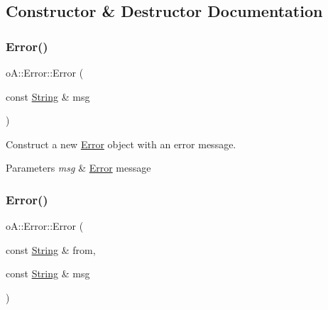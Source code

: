 \subsection{Constructor \& Destructor Documentation}
\mbox{\label{classo_a_1_1_error_a16d10704561d2b756722d71d8703089c}} 
\subsubsection{\texorpdfstring{Error()}{Error()}\hspace{0.1cm}{\footnotesize\ttfamily [1/2]}}
{\footnotesize\ttfamily o\+A\+::\+Error\+::\+Error (\begin{DoxyParamCaption}\item[{const \mbox{\hyperlink{classo_a_1_1_string}{String}} \&}]{msg }\end{DoxyParamCaption})\hspace{0.3cm}{\ttfamily [inline]}}



Construct a new \mbox{\hyperlink{classo_a_1_1_error}{Error}} object with an error message. 


\begin{DoxyParams}{Parameters}
{\em msg} & \mbox{\hyperlink{classo_a_1_1_error}{Error}} message \\
\hline
\end{DoxyParams}
\mbox{\label{classo_a_1_1_error_adf66492ca8b03fa14d09e5bba7cdacbd}} 
\subsubsection{\texorpdfstring{Error()}{Error()}\hspace{0.1cm}{\footnotesize\ttfamily [2/2]}}
{\footnotesize\ttfamily o\+A\+::\+Error\+::\+Error (\begin{DoxyParamCaption}\item[{const \mbox{\hyperlink{classo_a_1_1_string}{String}} \&}]{from,  }\item[{const \mbox{\hyperlink{classo_a_1_1_string}{String}} \&}]{msg }\end{DoxyParamCaption})\hspace{0.3cm}{\ttfamily [inline]}}



